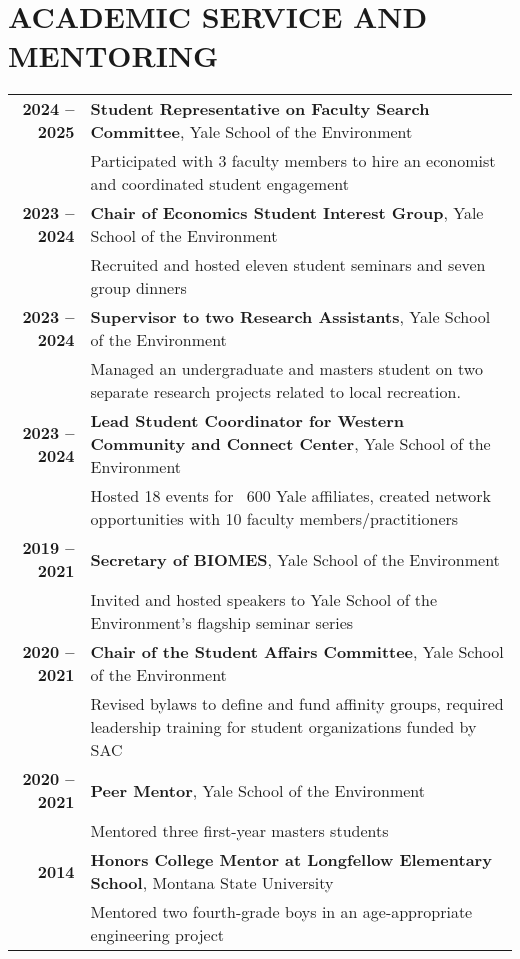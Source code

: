 \documentclass[11pt]{article}
\begin{document}
\section*{ACADEMIC SERVICE AND MENTORING}
\begin{tabularx}{\linewidth}{>{\bfseries}r X} %
2024 – 2025 & \textbf{Student Representative on Faculty Search Committee}, Yale School of the Environment \\
    & Participated with 3 faculty members to hire an economist and coordinated student engagement \\[1ex]
2023 – 2024 & \textbf{Chair of Economics Student Interest Group}, Yale School of the Environment \\
    & Recruited and hosted eleven student seminars and seven group dinners \\[1ex]
2023 – 2024 & \textbf{Supervisor to two Research Assistants}, Yale School of the Environment \\
    & Managed an undergraduate and masters student on two separate research projects related to local recreation.\\
2023 – 2024 & \textbf{Lead Student Coordinator for Western Community and Connect Center}, Yale School of the Environment \\
    & Hosted 18 events for ~600 Yale affiliates, created network opportunities with 10 faculty members/practitioners \\[1ex]
2019 – 2021 & \textbf{Secretary of BIOMES}, Yale School of the Environment \\
    & Invited and hosted speakers to Yale School of the Environment’s flagship seminar series \\[1ex]
2020 – 2021 & \textbf{Chair of the Student Affairs Committee}, Yale School of the Environment \\
    & Revised bylaws to define and fund affinity groups, required leadership training for student organizations funded by SAC \\[1ex]
2020 – 2021 & \textbf{Peer Mentor}, Yale School of the Environment \\
    & Mentored three first-year masters students \\[1ex]
2014 & \textbf{Honors College Mentor at Longfellow Elementary School}, Montana State University \\
    & Mentored two fourth-grade boys in an age-appropriate engineering project \\
\end{tabularx}
\end{document}
